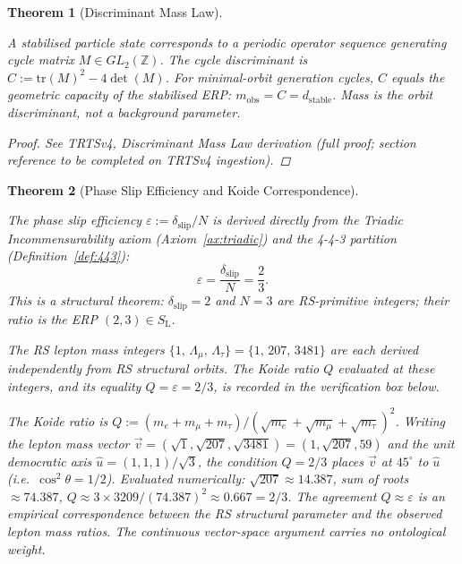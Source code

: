 \documentclass[11pt, letterpaper]{article}
\newcommand{\Z}{\mathbb{Z}}
\newcommand{\SL}{S_{\mathrm{L}}}
\theoremstyle{definition}
\theoremstyle{plain}
\newtheorem{theorem}{Theorem}[section]
\begin{document}
\begin{theorem}[Discriminant Mass Law]\label{thm:disc-mass}
\begin{rsbox}
A stabilised particle state corresponds to a periodic operator sequence
generating cycle matrix $M\in GL_2(\Z)$.  The cycle discriminant is
$C:=\mathrm{tr}(M)^2-4\det(M)$.  For minimal-orbit generation cycles, $C$
equals the geometric capacity of the stabilised ERP:
$m_{\mathrm{obs}}=C=d_{\mathrm{stable}}$.  Mass is the orbit discriminant,
not a background parameter.
\end{rsbox}
\begin{proof}
See TRTSv4, Discriminant Mass Law derivation (full proof; section reference
to be completed on TRTSv4 ingestion).
\end{proof}
\end{theorem}

\begin{theorem}[Phase Slip Efficiency and Koide Correspondence]
\label{thm:koide}
\begin{rsbox}
The phase slip efficiency $\varepsilon:=\delta_{\mathrm{slip}}/N$ is derived
directly from the Triadic Incommensurability axiom (Axiom~\ref{ax:triadic})
and the 4-4-3 partition (Definition~\ref{def:443}):
\[
\varepsilon = \frac{\delta_{\mathrm{slip}}}{N} = \frac{2}{3}.
\]
This is a structural theorem: $\delta_{\mathrm{slip}}=2$ and $N=3$ are
RS-primitive integers; their ratio is the ERP $(2,3)\in\SL$.

The RS lepton mass integers $\{1,\,\Lambda_\mu,\,\Lambda_\tau\}
=\{1,\,207,\,3481\}$ are each derived independently from RS structural
orbits.  The Koide ratio $Q$ evaluated at these integers, and its equality
$Q=\varepsilon=2/3$, is recorded in the verification box below.
\end{rsbox}
\begin{verifybox}
The Koide ratio is $Q:=(m_e+m_\mu+m_\tau)/
(\sqrt{m_e}+\sqrt{m_\mu}+\sqrt{m_\tau})^2$.  Writing the lepton mass vector
$\vec{v}=(\sqrt{1},\sqrt{207},\sqrt{3481})=(1,\sqrt{207},59)$ and the unit
democratic axis $\hat{u}=(1,1,1)/\sqrt{3}$, the condition $Q=2/3$ places
$\vec{v}$ at $45^\circ$ to $\hat{u}$ (i.e.\ $\cos^2\theta=1/2$).
Evaluated numerically: $\sqrt{207}\approx 14.387$, sum of roots
$\approx 74.387$, $Q\approx 3\times 3209/(74.387)^2\approx 0.667=2/3$.
The agreement $Q\approx\varepsilon$ is an empirical correspondence between
the RS structural parameter and the observed lepton mass ratios.  The
continuous vector-space argument carries no ontological weight.
\end{verifybox}
\end{theorem}
\end{document}
